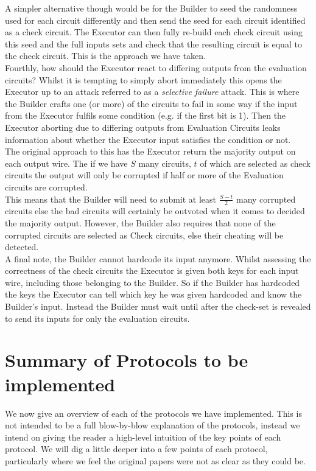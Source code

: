 \documentclass[ %
                    author={Nicholas Tutte},
                supervisor={Prof. Nigel Smart},
                    degree={MEng},
                     title={Secure Two Party Computation},
                  subtitle={A practical comparison of recent protocols},
                      type={Research - GG1K},
                      year={2015} ]{dissertation}
\begin{document}
				A simpler alternative though would be for the Builder to seed the randomness used for each circuit differently and then send the seed for each circuit identified as a check circuit. The Executor can then fully re-build each check circuit using this seed and the full inputs sets and check that the resulting circuit is equal to the check circuit. This is the approach we have taken.\\

				Fourthly, how should the Executor react to differing outputs from the evaluation circuits? Whilst it is tempting to simply abort immediately this opens the Executor up to an attack referred to as a \emph{selective failure} attack. This is where the Builder crafts one (or more) of the circuits to fail in some way if the input from the Executor fulfils some condition (e.g. if the first bit is 1). Then the Executor aborting due to differing outputs from Evaluation Circuits leaks information about whether the Executor input satisfies the condition or not.\\

				The original approach to this has the Executor return the majority output on each output wire. The if we have $S$ many circuits, $t$ of which are selected as check circuits the output will only be corrupted if half or more of the Evaluation circuits are corrupted.\\

				This means that the Builder will need to submit at least $\frac{S - t}{2}$ many corrupted circuits else the bad circuits will certainly be outvoted when it comes to decided the majority output. However, the Builder also requires that none of the corrupted circuits are selected as Check circuits, else their cheating will be detected.\\

				A final note, the Builder cannot hardcode its input anymore. Whilst assessing the correctness of the check circuits the Executor is given both keys for each input wire, including those belonging to the Builder. So if the Builder has hardcoded the keys the Executor can tell which key he was given hardcoded and know the Builder's input. Instead the Builder must wait until after the check-set is revealed to send its inputs for only the evaluation circuits.

	\chapter{Summary of Protocols to be implemented} \label{sec:Protocols}
		We now give an overview of each of the protocols we have implemented. This is not intended to be a full blow-by-blow explanation of the protocols, instead we intend on giving the reader a high-level intuition of the key points of each protocol. We will dig a little deeper into a few points of each protocol, particularly where we feel the original papers were not as clear as they could be.
\end{document}
